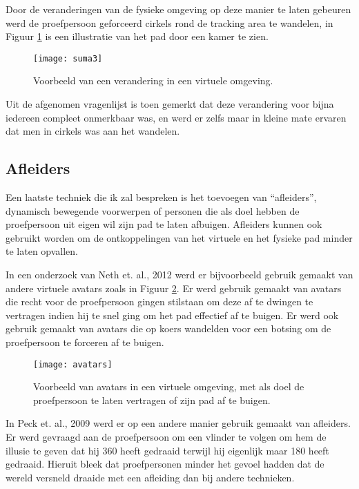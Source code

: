 Door de veranderingen van de fysieke omgeving op deze manier te laten gebeuren
werd de proefpersoon geforceerd cirkels rond de tracking area te wandelen, in
Figuur \ref{fig:suma3} is een illustratie van het pad door een kamer te zien.

\begin{figure}[h!]
    \centering
    \texttt{[image: suma3]}
    \caption{Voorbeeld van een verandering in een virtuele omgeving.\cite{suma11}}
    \label{fig:suma3}
\end{figure}

Uit de afgenomen vragenlijst is toen gemerkt dat deze verandering voor bijna 
iedereen compleet onmerkbaar was, en werd er zelfs maar in kleine mate ervaren
dat men in cirkels was aan het wandelen.


\subsection{Afleiders}
Een laatste techniek die ik zal bespreken is het toevoegen van ``afleiders'',
dynamisch bewegende voorwerpen of personen die als doel hebben de proefpersoon
uit eigen wil zijn pad te laten afbuigen. Afleiders kunnen ook gebruikt worden
om de ontkoppelingen van het virtuele en het fysieke pad minder te laten 
opvallen.

In een onderzoek van Neth et. al., 2012 \cite{neth12} werd er bijvoorbeeld 
gebruik gemaakt van andere virtuele avatars zoals in Figuur \ref{fig:avatars}.
Er werd gebruik gemaakt van avatars die recht voor de proefpersoon gingen
stilstaan om deze af te dwingen te vertragen indien hij te snel ging om het pad
effectief af te buigen. Er werd ook gebruik gemaakt van avatars die op koers
wandelden voor een botsing om de proefpersoon te forceren af te buigen.

\begin{figure}[h!]
    \centering
    \texttt{[image: avatars]}
    \caption{Voorbeeld van avatars in een virtuele omgeving, met als doel de
    proefpersoon te laten vertragen of zijn pad af te buigen.\cite{neth12}}
    \label{fig:avatars}
\end{figure}

In Peck et. al., 2009 \cite{peck09} werd er op een andere manier gebruik gemaakt 
van afleiders. Er werd gevraagd aan de proefpersoon om een vlinder te volgen om
hem de illusie te geven dat hij \mbox{360\textdegree} heeft gedraaid terwijl hij 
eigenlijk maar 180\textdegree{} heeft gedraaid. Hieruit bleek dat proefpersonen 
minder het gevoel hadden dat de wereld versneld draaide met een afleiding dan 
bij andere technieken.


